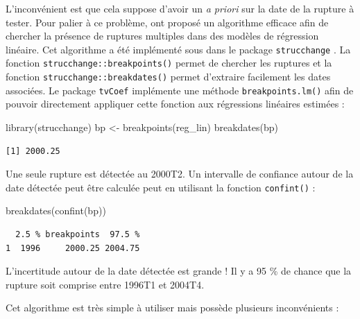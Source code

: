 \documentclass[
  a4paper,
  DIV=11,
  numbers=noendperiod,
  french]{scrartcl}
\newenvironment{Shaded}{\begin{snugshade}}{\end{snugshade}}
\newcommand{\FunctionTok}[1]{\textcolor[rgb]{0.28,0.35,0.67}{#1}}
\newcommand{\NormalTok}[1]{\textcolor[rgb]{0.00,0.23,0.31}{#1}}
\newcommand{\OtherTok}[1]{\textcolor[rgb]{0.00,0.23,0.31}{#1}}
\newcommand\1{{\mathds 1}}
\theoremstyle{remark}
\begin{document}
L'inconvénient est que cela suppose d'avoir un \emph{a priori} sur la
date de la rupture à tester. Pour palier à ce problème,
\textcite{bai2003computation} ont proposé un algorithme efficace afin de
chercher la présence de ruptures multiples dans des modèles de
régression linéaire. Cet algorithme a été implémenté sous
 dans le package \texttt{strucchange}
\autocite{strucchangeBP}. La fonction
\texttt{strucchange::breakpoints()} permet de chercher les ruptures et
la fonction \texttt{strucchange::breakdates()} permet d'extraire
facilement les dates associées. Le package \texttt{tvCoef} implémente
une méthode \texttt{breakpoints.lm()} afin de pouvoir directement
appliquer cette fonction aux régressions linéaires estimées :

\begin{Shaded}
\begin{Highlighting}[]
\FunctionTok{library}\NormalTok{(strucchange)}
\NormalTok{bp }\OtherTok{\textless{}{-}} \FunctionTok{breakpoints}\NormalTok{(reg\_lin)}
\FunctionTok{breakdates}\NormalTok{(bp)}
\end{Highlighting}
\end{Shaded}

\begin{verbatim}
[1] 2000.25
\end{verbatim}

Une seule rupture est détectée au 2000T2. Un intervalle de confiance
autour de la date détectée peut être calculée peut en utilisant la
fonction \texttt{confint()} :

\begin{Shaded}
\begin{Highlighting}[]
\FunctionTok{breakdates}\NormalTok{(}\FunctionTok{confint}\NormalTok{(bp))}
\end{Highlighting}
\end{Shaded}

\begin{verbatim}
  2.5 % breakpoints  97.5 %
1  1996     2000.25 2004.75
\end{verbatim}

L'incertitude autour de la date détectée est grande ! Il y a 95 \% de
chance que la rupture soit comprise entre 1996T1 et 2004T4.

Cet algorithme est très simple à utiliser mais possède plusieurs
inconvénients :
\end{document}
